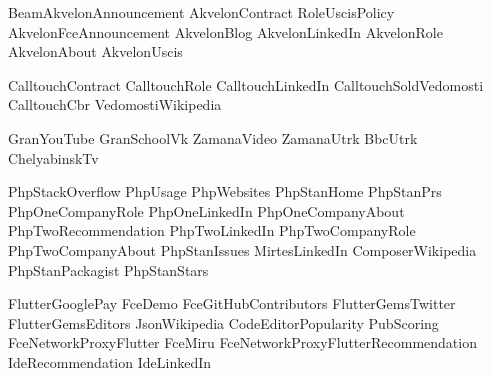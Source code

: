 {BeamAkvelonAnnouncement}
{AkvelonContract}
{RoleUscisPolicy}
{AkvelonFceAnnouncement}
{AkvelonBlog}
{AkvelonLinkedIn}
{AkvelonRole}
{AkvelonAbout}
{AkvelonUscis}

{CalltouchContract}
{CalltouchRole}
{CalltouchLinkedIn}
{CalltouchSoldVedomosti}
{CalltouchCbr}
{VedomostiWikipedia}

{GranYouTube}
{GranSchoolVk}
{ZamanaVideo}
{ZamanaUtrk}
{BbcUtrk}
{ChelyabinskTv}

{PhpStackOverflow}
{PhpUsage}
{PhpWebsites}
{PhpStanHome}
{PhpStanPrs}
{PhpOneCompanyRole}
{PhpOneLinkedIn}
{PhpOneCompanyAbout}
{PhpTwoRecommendation}
{PhpTwoLinkedIn}
{PhpTwoCompanyRole}
{PhpTwoCompanyAbout}
{PhpStanIssues}
{MirtesLinkedIn}
{ComposerWikipedia}
{PhpStanPackagist}
{PhpStanStars}

{FlutterGooglePay}
{FceDemo}
{FceGitHubContributors}
{FlutterGemsTwitter}
{FlutterGemsEditors}
{JsonWikipedia}
{CodeEditorPopularity}
{PubScoring}
{FceNetworkProxyFlutter}
{FceMiru}
{FceNetworkProxyFlutterRecommendation}
{IdeRecommendation}
{IdeLinkedIn}

